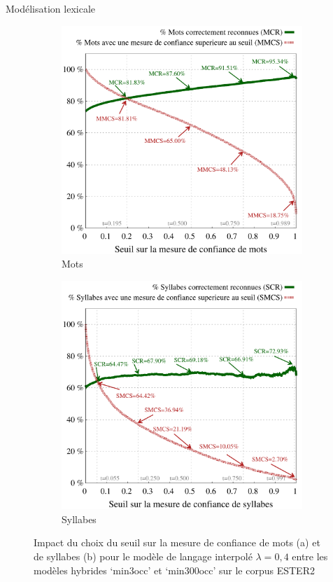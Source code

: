 \documentclass{style/these}
\begin{document}
\begin{part}{Modélisation lexicale}
\begin{figure}[h!]
\begin{subfigure}{0.5\textwidth}
\centering
\includegraphics[scale=0.4]{images/results/ESTER_combined_mixedLMs-3-300-lambda40_words_CM.pdf}
\caption{Mots}
\end{subfigure}
\begin{subfigure}{0.5\textwidth}
\centering
\includegraphics[scale=0.4]{images/results/ESTER_combined_mixedLMs-3-300-lambda40_syllables_CM.pdf}
\caption{Syllabes}
\end{subfigure}
\caption{Impact du choix du seuil sur la mesure de confiance de mots (a) et de syllabes (b) pour le modèle de langage interpolé $\lambda=0,4$ entre les modèles hybrides `min3occ' et `min300occ' sur le corpus ESTER2 }
\label{Fig:MC-ESTER2-lambda04}
\end{figure}




\end{part}
\end{document}
